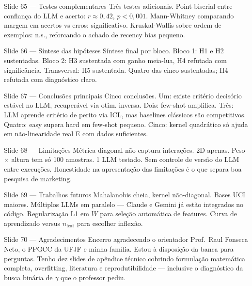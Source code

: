 \documentclass[aspectratio=169,10pt]{beamer}
\begin{document}
\begin{frame}{Slide 65 --- Testes complementares}
\footnotesize
Tr\^es testes adicionais. Point-biserial entre confian\c{c}a do LLM e acerto: $r \approx 0{,}42$, $p<0{,}001$. Mann-Whitney comparando margem em acertos vs erros: significativo. Kruskal-Wallis sobre ordem de exemplos: n.s., reforcando o achado de recency bias pequeno.
\end{frame}

\begin{frame}{Slide 66 --- S\'intese das hip\'oteses}
\footnotesize
S\'intese final por bloco. Bloco 1: H1 e H2 sustentadas. Bloco 2: H3 sustentada com ganho meia-lua, H4 refutada com signific\^ancia. Transversal: H5 sustentada. Quatro das cinco sustentadas; H4 refutada com diagn\'ostico claro.
\end{frame}

\begin{frame}{Slide 67 --- Conclus\~oes principais}
\footnotesize
Cinco conclus\~oes. Um: existe crit\'erio decis\'orio est\'avel no LLM, recuper\'avel via otim. inversa. Dois: few-shot amplifica. Tr\^es: LLM aprende crit\'erio de perito via ICL, mas baselines cl\'assicos s\~ao competitivos. Quatro: easy supera hard em few-shot pequeno. Cinco: kernel quadr\'atico s\'o ajuda em n\~ao-linearidade real E com dados suficientes.
\end{frame}

\begin{frame}{Slide 68 --- Limita\c{c}\~oes}
\footnotesize
M\'etrica diagonal n\~ao captura intera\c{c}\~oes. 2D apenas. Peso $\times$ altura tem s\'o 100 amostras. 1 LLM testado. Sem controle de vers\~ao do LLM entre execu\c{c}\~oes. Honestidade na apresenta\c{c}\~ao das limita\c{c}\~oes \'e o que separa boa pesquisa de marketing.
\end{frame}

\begin{frame}{Slide 69 --- Trabalhos futuros}
\footnotesize
Mahalanobis cheia, kernel n\~ao-diagonal. Bases UCI maiores. M\'ultiplos LLMs em paralelo --- Claude e Gemini j\'a est\~ao integrados no c\'odigo. Regulariza\c{c}\~ao L1 em $W$ para sele\c{c}\~ao autom\'atica de features. Curva de aprendizado versus $n_{\text{feat}}$ para escolher inflex\~ao.
\end{frame}

\begin{frame}{Slide 70 --- Agradecimentos}
\footnotesize
Encerro agradecendo o orientador Prof.\ Raul Fonseca Neto, o PPGCC da UFJF e minha fam\'ilia. Estou \`a disposi\c{c}\~ao da banca para perguntas. Tenho dez slides de ap\^endice t\'ecnico cobrindo formula\c{c}\~ao matem\'atica completa, overfitting, literatura e reprodutibilidade --- inclusive o diagn\'ostico da busca bin\'aria de $\gamma$ que o professor pediu.
\end{frame}
\end{document}

